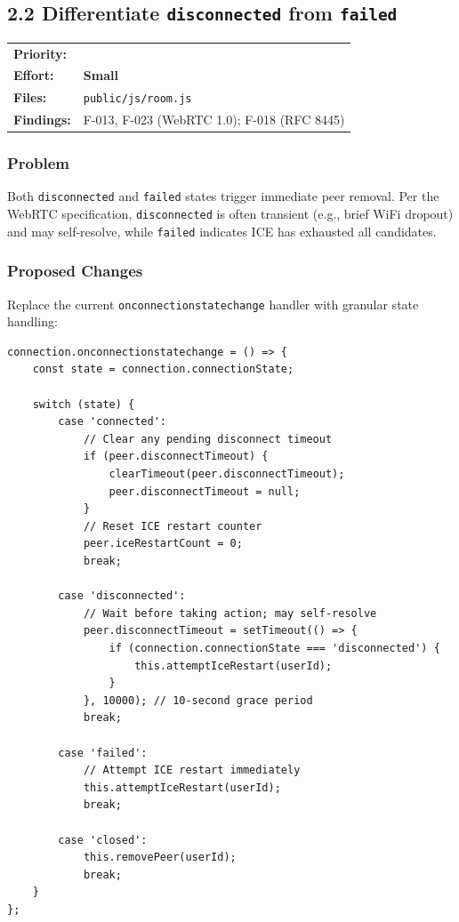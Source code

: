 \documentclass[11pt,letterpaper]{article}
\newcommand{\prihigh}{\colorbox{major}{\textcolor{white}{\small\textbf{HIGH}}}}
\newcommand{\effsmall}{\colorbox{compliant!30}{\small\textbf{Small}}}
\begin{document}
\subsection{2.2 Differentiate \texttt{disconnected} from \texttt{failed}}

\begin{tabular}{ll}
\textbf{Priority:} & \prihigh \\
\textbf{Effort:} & \effsmall \\
\textbf{Files:} & \texttt{public/js/room.js} \\
\textbf{Findings:} & F-013, F-023 (WebRTC 1.0); F-018 (RFC 8445) \\
\end{tabular}

\subsubsection{Problem}

Both \texttt{disconnected} and \texttt{failed} states trigger immediate peer removal. Per the WebRTC specification, \texttt{disconnected} is often transient (e.g., brief WiFi dropout) and may self-resolve, while \texttt{failed} indicates ICE has exhausted all candidates.

\subsubsection{Proposed Changes}

Replace the current \texttt{onconnectionstatechange} handler with granular state handling:

\begin{verbatim}
connection.onconnectionstatechange = () => {
    const state = connection.connectionState;

    switch (state) {
        case 'connected':
            // Clear any pending disconnect timeout
            if (peer.disconnectTimeout) {
                clearTimeout(peer.disconnectTimeout);
                peer.disconnectTimeout = null;
            }
            // Reset ICE restart counter
            peer.iceRestartCount = 0;
            break;

        case 'disconnected':
            // Wait before taking action; may self-resolve
            peer.disconnectTimeout = setTimeout(() => {
                if (connection.connectionState === 'disconnected') {
                    this.attemptIceRestart(userId);
                }
            }, 10000); // 10-second grace period
            break;

        case 'failed':
            // Attempt ICE restart immediately
            this.attemptIceRestart(userId);
            break;

        case 'closed':
            this.removePeer(userId);
            break;
    }
};
\end{verbatim}
\end{document}
